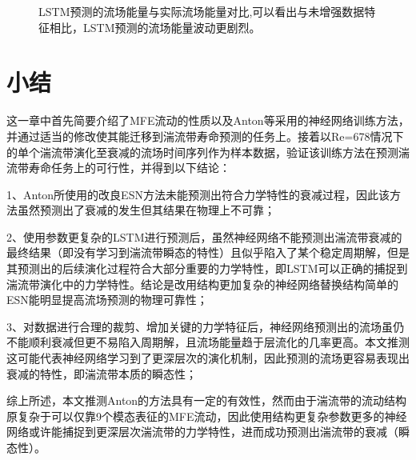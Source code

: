 \begin{figure}[htb]
	\begin{minipage}[h]{\linewidth}
	\centering
	\end{minipage}
	\quad
	\caption{LSTM预测的流场能量与实际流场能量对比,可以看出与未增强数据特征相比，LSTM预测的流场能量波动更剧烈。}
\label{fig:LSTM_angle_eny}
\end{figure}

\section{小结}
这一章中首先简要介绍了MFE流动的性质以及Anton等采用的神经网络训练方法，并通过适当的修改使其能迁移到湍流带寿命预测的任务上。接着以Re=678情况下的单个湍流带演化至衰减的流场时间序列作为样本数据，验证该训练方法在预测湍流带寿命任务上的可行性，并得到以下结论：

1、Anton所使用的改良ESN方法未能预测出符合力学特性的衰减过程，因此该方法虽然预测出了衰减的发生但其结果在物理上不可靠；

2、使用参数更复杂的LSTM进行预测后，虽然神经网络不能预测出湍流带衰减的最终结果（即没有学习到湍流带瞬态的特性）且似乎陷入了某个稳定周期解，但是其预测出的后续演化过程符合大部分重要的力学特性，即LSTM可以正确的捕捉到湍流带演化中的力学特性。结论是改用结构更加复杂的神经网络替换结构简单的ESN能明显提高流场预测的物理可靠性；

3、对数据进行合理的裁剪、增加关键的力学特征后，神经网络预测出的流场虽仍不能顺利衰减但更不易陷入周期解，且流场能量趋于层流化的几率更高。本文推测这可能代表神经网络学习到了更深层次的演化机制，因此预测的流场更容易表现出衰减的特性，即湍流带本质的瞬态性；

综上所述，本文推测Anton的方法具有一定的有效性，然而由于湍流带的流动结构原复杂于可以仅靠9个模态表征的MFE流动，因此使用结构更复杂参数更多的神经网络或许能捕捉到更深层次湍流带的力学特性，进而成功预测出湍流带的衰减（瞬态性）。

